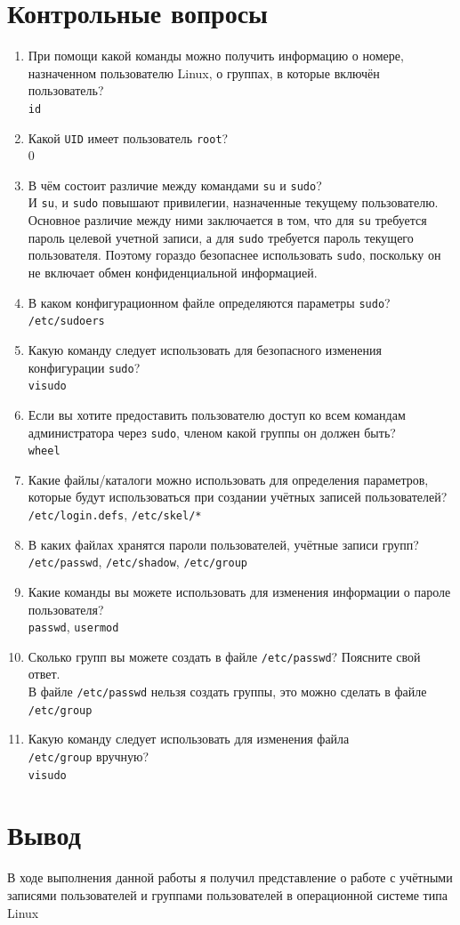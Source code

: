 \documentclass[12pt]{article}
\begin{document}
  \section{Контрольные вопросы}
    \begin{enumerate}
      \item При помощи какой команды можно получить информацию о номере, назначенном пользователю Linux, о группах, в которые включён пользователь?
        \\\texttt{id}
      \item Какой \texttt{UID} имеет пользователь \texttt{root}?
        \\0
      \item В чём состоит различие между командами \texttt{su} и \texttt{sudo}?
        \\И \texttt{su}, и \texttt{sudo} повышают привилегии, назначенные текущему пользователю. Основное различие между ними заключается в том, что для \texttt{su} требуется пароль целевой учетной записи, а для \texttt{sudo} требуется пароль текущего пользователя. Поэтому гораздо безопаснее использовать \texttt{sudo}, поскольку он не включает обмен конфиденциальной информацией.
      \item В каком конфигурационном файле определяются параметры \texttt{sudo}?
        \\\texttt{/etc/sudoers}
      \item Какую команду следует использовать для безопасного изменения конфигурации \texttt{sudo}?
        \\\texttt{visudo}
      \item Если вы хотите предоставить пользователю доступ ко всем командам администратора через \texttt{sudo}, членом какой группы он должен быть?
        \\\texttt{wheel}
      \item Какие файлы/каталоги можно использовать для определения параметров, которые будут использоваться при создании учётных записей пользователей?
        \\\texttt{/etc/login.defs}, \texttt{/etc/skel/*}
      \item В каких файлах хранятся пароли пользователей, учётные записи групп?
        \\\texttt{/etc/passwd}, \texttt{/etc/shadow}, \texttt{/etc/group}
      \item Какие команды вы можете использовать для изменения информации о пароле пользователя?
        \\\texttt{passwd}, \texttt{usermod}
      \item Сколько групп вы можете создать в файле \texttt{/etc/passwd}? Поясните свой ответ.
        \\В файле \texttt{/etc/passwd} нельзя создать группы, это можно сделать в файле \texttt{/etc/group}
      \item Какую команду следует использовать для изменения файла\\ \texttt{/etc/group} вручную?
        \\\texttt{visudo}
    \end{enumerate}
  \section{Вывод}
    В ходе выполнения данной работы я получил представление о работе с учётными записями пользователей и группами пользователей в операционной системе типа Linux
\end{document}
